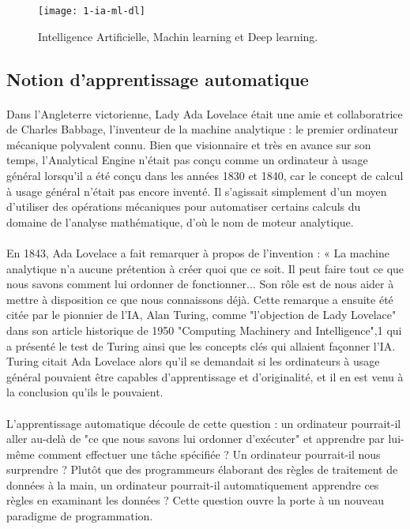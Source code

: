 \begin{figure}[h]
    \centering
    \texttt{[image: 1-ia-ml-dl]}
    \caption{Intelligence Artificielle, Machin learning et Deep learning.}
    \label{fig:1-ia-ml-dl}
\end{figure}

\subsection{Notion d'apprentissage automatique}
\paragraph{}Dans l'Angleterre victorienne, Lady Ada Lovelace était une amie et collaboratrice de Charles Babbage, l'inventeur de la machine analytique : le premier ordinateur mécanique polyvalent connu. Bien que visionnaire et très en avance sur son temps, l'Analytical Engine n'était pas conçu comme un ordinateur à usage général lorsqu'il a été conçu dans les années 1830 et 1840, car le concept de calcul à usage général n'était pas encore inventé. Il s'agissait simplement d'un moyen d'utiliser des opérations mécaniques pour automatiser certains calculs du domaine de l'analyse mathématique, d'où le nom de moteur analytique. 
\paragraph{}En 1843, Ada Lovelace a fait remarquer à propos de l'invention : « La machine analytique n'a aucune prétention à créer quoi que ce soit. Il peut faire tout ce que nous savons comment lui ordonner de fonctionner... Son rôle est de nous aider à mettre à disposition ce que nous connaissons déjà. Cette remarque a ensuite été citée par le pionnier de l'IA, Alan Turing, comme "l'objection de Lady Lovelace" dans son article historique de 1950 "Computing Machinery and Intelligence",1 qui a présenté le test de Turing ainsi que les concepts clés qui allaient façonner l'IA. Turing citait Ada Lovelace alors qu'il se demandait si les ordinateurs à usage général pouvaient être capables d'apprentissage et d'originalité, et il en est venu à la conclusion qu'ils le pouvaient.
\paragraph{}L'apprentissage automatique découle de cette question : un ordinateur pourrait-il aller au-delà de "ce que nous savons lui ordonner d'exécuter" et apprendre par lui-même comment effectuer une tâche spécifiée ? Un ordinateur pourrait-il nous surprendre ? Plutôt que des programmeurs élaborant des règles de traitement de données à la main, un ordinateur pourrait-il automatiquement apprendre ces règles en examinant les données ?
Cette question ouvre la porte à un nouveau paradigme de programmation. 
